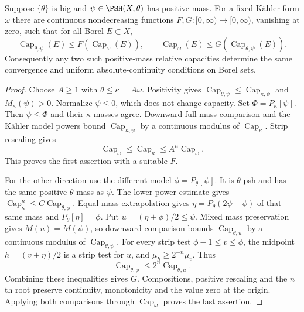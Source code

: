 \begin{theorem}\label{thm:global-relative-capacity-comparison}
Suppose $\{\theta\}$ is big and $\psi\in\PSH(X,\theta)$ has positive mass. For a fixed K\"ahler form $\omega$ there are continuous nondecreasing functions $F,G:[0,\infty)\to[0,\infty)$, vanishing at zero, such that for all Borel $E\subset X$,
\[
 \operatorname{Cap}_{\theta,\psi}(E)\leq F(\operatorname{Cap}_\omega(E)),
 \qquad \operatorname{Cap}_\omega(E)\leq G(\operatorname{Cap}_{\theta,\psi}(E)).
\]
Consequently any two such positive-mass relative capacities determine the same convergence and uniform absolute-continuity conditions on Borel sets.
\end{theorem}
\begin{proof}
Choose $A\geq1$ with $\theta\leq\kappa=A\omega$. Positivity gives
$\operatorname{Cap}_{\theta,\psi}\leq\operatorname{Cap}_{\kappa,\psi}$ and $M_\kappa(\psi)>0$. Normalize $\psi\leq0$, which does not change capacity. Set $\Phi=P_\kappa[\psi]$. Then $\psi\leq\Phi$ and their $\kappa$ masses agree. Downward full-mass comparison and the K\"ahler model powers bound $\operatorname{Cap}_{\kappa,\psi}$ by a continuous modulus of $\operatorname{Cap}_\kappa$. Strip rescaling gives
\[
 \operatorname{Cap}_\omega\leq\operatorname{Cap}_\kappa
                              \leq A^n\operatorname{Cap}_\omega.
\]
This proves the first assertion with a suitable $F$.

For the other direction use the different model $\phi=P_\theta[\psi]$. It is $\theta$-psh and has the same positive $\theta$ mass as $\psi$. The lower power estimate gives
$\operatorname{Cap}_\kappa^n\leq C\operatorname{Cap}_{\theta,\phi}$. Equal-mass extrapolation gives
$\eta=P_\theta(2\psi-\phi)$ of that same mass and $P_\theta[\eta]=\phi$. Put $u=(\eta+\phi)/2\leq\psi$. Mixed mass preservation gives $M(u)=M(\psi)$, so downward comparison bounds $\operatorname{Cap}_{\theta,u}$ by a continuous modulus of $\operatorname{Cap}_{\theta,\psi}$. For every strip test $\phi-1\leq v\leq\phi$, the midpoint $h=(v+\eta)/2$ is a strip test for $u$, and $\mu_h\geq2^{-n}\mu_v$. Thus
\[
 \operatorname{Cap}_{\theta,\phi}\leq2^n\operatorname{Cap}_{\theta,u}.
\]
Combining these inequalities gives $G$. Compositions, positive rescaling and the $n$th root preserve continuity, monotonicity and the value zero at the origin. Applying both comparisons through $\operatorname{Cap}_\omega$ proves the last assertion.
\end{proof}

